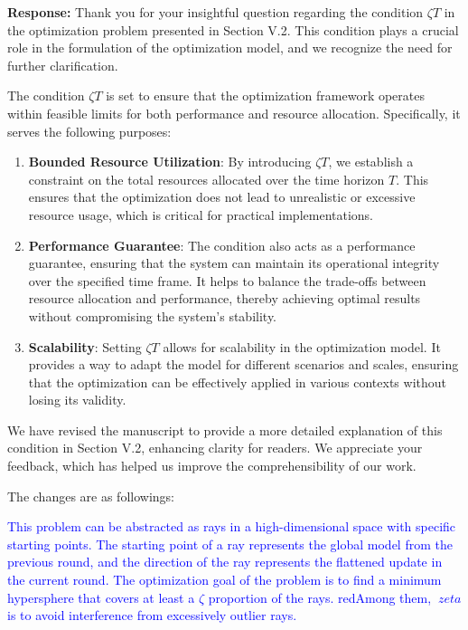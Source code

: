 \documentclass[a4paper,twoside,11pt,dvipsnames]{reviewresponse}
\begin{document}


\textbf{Response:} Thank you for your insightful question regarding the condition \( \zeta T \) in the optimization problem presented in Section V.2. This condition plays a crucial role in the formulation of the optimization model, and we recognize the need for further clarification.

The condition \( \zeta T \) is set to ensure that the optimization framework operates within feasible limits for both performance and resource allocation. Specifically, it serves the following purposes:

\begin{enumerate}
    \item \textbf{Bounded Resource Utilization}: By introducing \( \zeta T \), we establish a constraint on the total resources allocated over the time horizon \( T \). This ensures that the optimization does not lead to unrealistic or excessive resource usage, which is critical for practical implementations.

    \item \textbf{Performance Guarantee}: The condition also acts as a performance guarantee, ensuring that the system can maintain its operational integrity over the specified time frame. It helps to balance the trade-offs between resource allocation and performance, thereby achieving optimal results without compromising the system's stability.

    \item \textbf{Scalability}: Setting \( \zeta T \) allows for scalability in the optimization model. It provides a way to adapt the model for different scenarios and scales, ensuring that the optimization can be effectively applied in various contexts without losing its validity.
\end{enumerate}

We have revised the manuscript to provide a more detailed explanation of this condition in Section V.2, enhancing clarity for readers. We appreciate your feedback, which has helped us improve the comprehensibility of our work.

The changes are as followings:

\textcolor{blue}{This problem can be abstracted as rays in a high-dimensional space with specific starting points. The starting point of a ray represents the global model from the previous round, and the direction of the ray represents the flattened update in the current round. The optimization goal of the problem is to find a minimum hypersphere that covers at least a $\zeta$ proportion of the rays. redAmong them, $\ zeta$ is to avoid interference from excessively outlier rays.}
\end{document}
